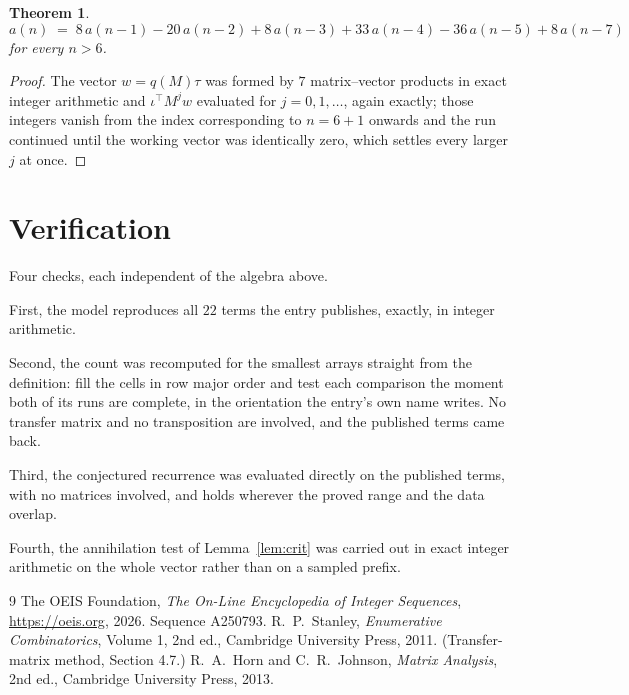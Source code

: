 \documentclass[11pt,a4paper]{article}
\theoremstyle{plain}
\newtheorem{theorem}{Theorem}
\theoremstyle{definition}
\begin{document}
\begin{theorem}
\[
a(n)\;=\;8\,a(n-1) - 20\,a(n-2) + 8\,a(n-3) + 33\,a(n-4) - 36\,a(n-5) + 8\,a(n-7)
\]
for every $n>6$.
\end{theorem}

\begin{proof}
The vector $w=q(M)\tau$ was formed by $7$ matrix--vector products in exact integer
arithmetic and $\iota^{\!\top}M^{j}w$ evaluated for $j=0,1,\dots$, again exactly; those
integers vanish from the index corresponding to $n=6+1$ onwards and the run continued
until the working vector was identically zero, which settles every larger $j$ at once.
\end{proof}

\section{Verification}

Four checks, each independent of the algebra above.

First, the model reproduces all $22$ terms the entry publishes, exactly, in integer
arithmetic.

Second, the count was recomputed for the smallest arrays straight from the definition: fill the
cells in row major order and test each comparison the moment both of its runs are complete,
in the orientation the entry's own name writes. No transfer matrix and no transposition are
involved, and the published terms came back.

Third, the conjectured recurrence was evaluated directly on the published terms, with no
matrices involved, and holds wherever the proved range and the data overlap.

Fourth, the annihilation test of Lemma~\ref{lem:crit} was carried out in exact integer
arithmetic on the whole vector rather than on a sampled prefix.

\begin{thebibliography}{9}
 The OEIS Foundation, \emph{The On-Line Encyclopedia of Integer
Sequences}, \url{https://oeis.org}, 2026. Sequence A250793.
 R.~P.~Stanley, \emph{Enumerative Combinatorics}, Volume 1, 2nd ed.,
Cambridge University Press, 2011. (Transfer-matrix method, Section 4.7.)
 R.~A.~Horn and C.~R.~Johnson, \emph{Matrix Analysis}, 2nd ed., Cambridge
University Press, 2013.
\end{thebibliography}
\end{document}
